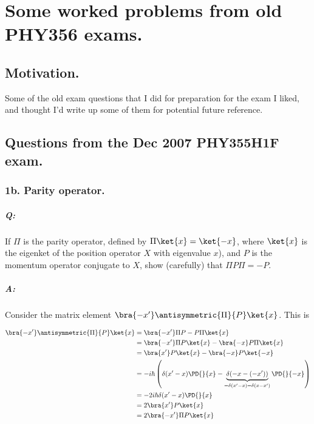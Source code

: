 
%

\chapter{Some worked problems from old PHY356 exams.}
\label{chap:qmIexamPractice}
{}
\date{Dec X, 2010}

\beginArtWithToc

\section{Motivation.}

Some of the old exam questions that I did for preparation for the exam I liked, and thought I'd write up some of them for potential future reference.

\section{Questions from the Dec 2007 PHY355H1F exam.}
\subsection{1b. Parity operator.}

\paragraph{Q:} If $\Pi$ is the parity operator, defined by $\Pi \ket{x} = \ket{-x}$, where $\ket{x}$ is the eigenket of the position operator $X$ with eigenvalue $x$), and $P$ is the momentum operator conjugate to $X$, show (carefully) that $\Pi P \Pi = -P$.

\paragraph{A:}

Consider the matrix element $\bra{-x'} \antisymmetric{\Pi}{P} \ket{x}$.  This is

\begin{align*}
\bra{-x'} \antisymmetric{\Pi}{P} \ket{x}
&=
\bra{-x'} \Pi P - P \Pi \ket{x} \\
&=
\bra{-x'} \Pi P \ket{x} - \bra{-x} P \Pi \ket{x} \\
&=
\bra{x'} P \ket{x} - \bra{-x} P \ket{-x} \\
&=
- i \hbar \left(
\delta(x'-x) \PD{}{x}
-\underbrace{\delta(-x -(-x'))}_{= \delta(x'-x) = \delta(x-x')} \PD{}{-x}
\right) \\
&=
- 2 i \hbar 
\delta(x'-x) \PD{}{x} \\
&=
2 \bra{x'} P \ket{x} \\
&=
2 \bra{-x'} \Pi P \ket{x} \\
\end{align*}

